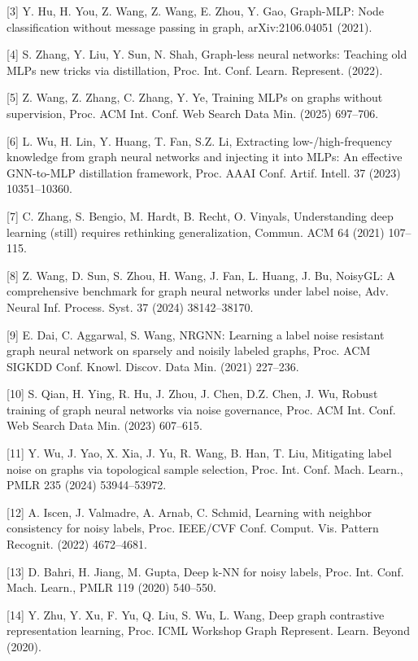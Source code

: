 {[}3{]} Y. Hu, H. You, Z. Wang, Z. Wang, E. Zhou, Y. Gao, Graph-MLP: Node classification without message passing in graph, arXiv:2106.04051 (2021).

{[}4{]} S. Zhang, Y. Liu, Y. Sun, N. Shah, Graph-less neural networks: Teaching old MLPs new tricks via distillation, Proc. Int. Conf. Learn. Represent. (2022).

{[}5{]} Z. Wang, Z. Zhang, C. Zhang, Y. Ye, Training MLPs on graphs without supervision, Proc. ACM Int. Conf. Web Search Data Min. (2025) 697--706.

{[}6{]} L. Wu, H. Lin, Y. Huang, T. Fan, S.Z. Li, Extracting low-/high-frequency knowledge from graph neural networks and injecting it into MLPs: An effective GNN-to-MLP distillation framework, Proc. AAAI Conf. Artif. Intell. 37 (2023) 10351--10360.

{[}7{]} C. Zhang, S. Bengio, M. Hardt, B. Recht, O. Vinyals, Understanding deep learning (still) requires rethinking generalization, Commun. ACM 64 (2021) 107--115.

{[}8{]} Z. Wang, D. Sun, S. Zhou, H. Wang, J. Fan, L. Huang, J. Bu, NoisyGL: A comprehensive benchmark for graph neural networks under label noise, Adv. Neural Inf. Process. Syst. 37 (2024) 38142--38170.

{[}9{]} E. Dai, C. Aggarwal, S. Wang, NRGNN: Learning a label noise resistant graph neural network on sparsely and noisily labeled graphs, Proc. ACM SIGKDD Conf. Knowl. Discov. Data Min. (2021) 227--236.

{[}10{]} S. Qian, H. Ying, R. Hu, J. Zhou, J. Chen, D.Z. Chen, J. Wu, Robust training of graph neural networks via noise governance, Proc. ACM Int. Conf. Web Search Data Min. (2023) 607--615.

{[}11{]} Y. Wu, J. Yao, X. Xia, J. Yu, R. Wang, B. Han, T. Liu, Mitigating label noise on graphs via topological sample selection, Proc. Int. Conf. Mach. Learn., PMLR 235 (2024) 53944--53972.

{[}12{]} A. Iscen, J. Valmadre, A. Arnab, C. Schmid, Learning with neighbor consistency for noisy labels, Proc. IEEE/CVF Conf. Comput. Vis. Pattern Recognit. (2022) 4672--4681.

{[}13{]} D. Bahri, H. Jiang, M. Gupta, Deep k-NN for noisy labels, Proc. Int. Conf. Mach. Learn., PMLR 119 (2020) 540--550.

{[}14{]} Y. Zhu, Y. Xu, F. Yu, Q. Liu, S. Wu, L. Wang, Deep graph contrastive representation learning, Proc. ICML Workshop Graph Represent. Learn. Beyond (2020).

